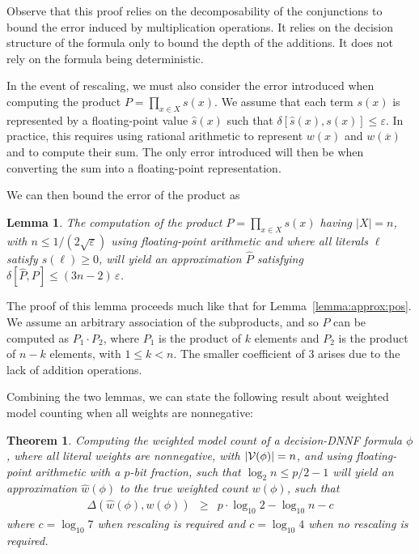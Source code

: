 \documentclass{easychair}
\newcommand{\obar}[1]{\overline{#1}}
\newcommand{\lit}{\ell}
\newcommand{\approximate}[1]{\hat{#1}}
\newcommand{\approxP}{\approximate{P}}
\newcommand{\approxw}{\approximate{w}}
\newcommand{\approxs}{\approximate{s}}
\newcommand{\aerror}{\delta}
\newcommand{\digitprecision}{\Delta}
\newcommand{\roundepsilon}{\varepsilon}
\newcommand{\varset}{X}
\newcommand{\dependencyset}{{\cal V}}
\newtheorem{theorem}{Theorem}
\newtheorem{lemma}{Lemma}
\begin{document}
Observe that this proof relies on the decomposability of the
conjunctions to bound the error induced by multiplication operations.
It relies on the decision structure of the formula only to bound the
depth of the additions.  It does not rely on the formula being deterministic.

In the event of rescaling, we must also consider the error introduced
when computing the product $P = \prod_{x\in\varset} s(x)$.  We assume that
each term $s(x)$ is represented by a floating-point value
$\approxs(x)$ such that $\aerror[\approxs(x), s(x)] \leq
\roundepsilon$.  In practice, this requires using rational arithmetic
to represent $w(x)$ and $w(\obar{x})$ and to compute their sum.  The
only error introduced will then be when converting the sum into
a floating-point representation.

We can then bound the error of the product as
\begin{lemma}
  The computation of the product $P = \prod_{x\in\varset} s(x)$ having
$|\varset| = n$, with $n \leq 1/(2\sqrt{\roundepsilon})$ using floating-point arithmetic
and where all literals $\ell$ satisfy $s(\lit) \geq 0$,
will yield an approximation $\approxP$ satisfying
  $\aerror[\approxP, P] \leq (3n-2)\,\roundepsilon$.
  \label{lemma:approx:product}
\end{lemma}

The proof of this lemma proceeds much like that for Lemma~\ref{lemma:approx:pos}.  We assume an arbitrary association of the subproducts, and so $P$ can be computed as
$P_1 \cdot P_2$, where $P_1$ is the product of $k$ elements and $P_2$ is the product of $n-k$ elements, with $1 \leq k < n$.
The smaller coefficient of $3$ arises due to the lack of addition operations.

Combining the two lemmas, we can state the following result about weighted model counting when all weights are nonnegative:
\begin{theorem}
  \label{thm:approx:pos}
Computing the weighted model count of
a decision-DNNF formula $\phi$, where all literal weights are nonnegative, with $|\dependencyset(\phi)| = n$, and using floating-point arithmetic with a $p$-bit fraction, such that $\log_2 n \leq p/2-1$
will yield an approximation $\approxw(\phi)$ to the true weighted count $w(\phi)$, such that
\begin{eqnarray}
\digitprecision(\approxw(\phi), w(\phi)) & \geq & p \cdot \log_{10}2 - \log_{10}n - c\label{eqn:precision:wmc}
\end{eqnarray}
where $c = \log_{10} 7$ when rescaling is required and $c = \log_{10} 4$ when no rescaling is required.
\end{theorem}
\end{document}
